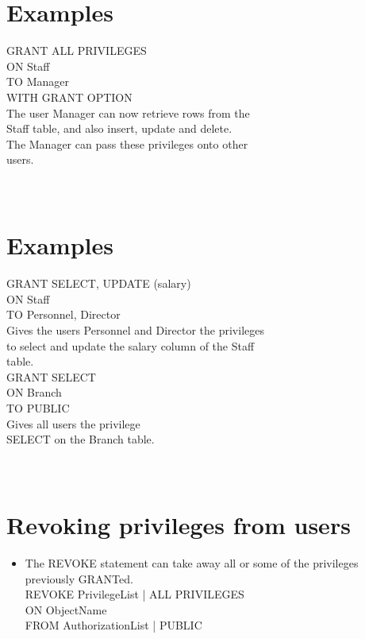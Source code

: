 \documentclass[12pt]{article}
\begin{document}
\section{Examples}
GRANT ALL PRIVILEGES\\
ON Staff\\
TO Manager\\
WITH GRANT OPTION\\
The user Manager can now retrieve rows from the \\
Staff table, and also insert, update and delete.\\
The Manager can pass these privileges onto other \\
users.\\
\\ 
 \\
\section{Examples}
GRANT SELECT, UPDATE (salary)\\
ON Staff\\
TO Personnel, Director\\
Gives the users Personnel and Director the privileges \\
to select and update the salary column of the Staff \\
table.\\
GRANT SELECT\\
ON Branch\\
TO PUBLIC\\
Gives all users the privilege \\
SELECT on the Branch table.\\
\\ 
 \\
\section{Revoking privileges from users}
\begin{itemize}
  \item The REVOKE statement can take away all or 
some of the privileges previously GRANTed.\\
REVOKE {PrivilegeList | ALL PRIVILEGES}\\
ON ObjectName\\
FROM {AuthorizationList | PUBLIC}\\
\end{itemize}
\\ 
 \\
\end{document}
